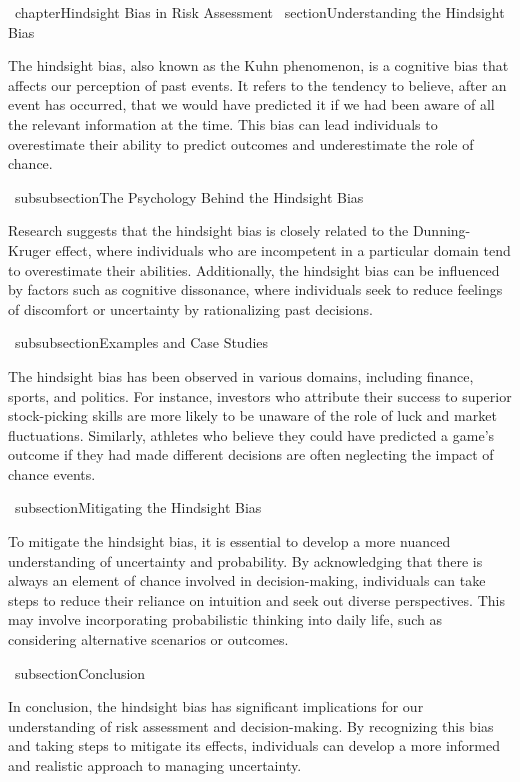 \ chapter{Hindsight Bias in Risk Assessment}
\ section{Understanding the Hindsight Bias}

The hindsight bias, also known as the Kuhn phenomenon, is a cognitive bias that affects our perception of past events. It refers to the tendency to believe, after an event has occurred, that we would have predicted it if we had been aware of all the relevant information at the time. This bias can lead individuals to overestimate their ability to predict outcomes and underestimate the role of chance.

\ subsubsection{The Psychology Behind the Hindsight Bias}

Research suggests that the hindsight bias is closely related to the Dunning-Kruger effect, where individuals who are incompetent in a particular domain tend to overestimate their abilities. Additionally, the hindsight bias can be influenced by factors such as cognitive dissonance, where individuals seek to reduce feelings of discomfort or uncertainty by rationalizing past decisions.

\ subsubsection{Examples and Case Studies}

The hindsight bias has been observed in various domains, including finance, sports, and politics. For instance, investors who attribute their success to superior stock-picking skills are more likely to be unaware of the role of luck and market fluctuations. Similarly, athletes who believe they could have predicted a game's outcome if they had made different decisions are often neglecting the impact of chance events.

\ subsection{Mitigating the Hindsight Bias}

To mitigate the hindsight bias, it is essential to develop a more nuanced understanding of uncertainty and probability. By acknowledging that there is always an element of chance involved in decision-making, individuals can take steps to reduce their reliance on intuition and seek out diverse perspectives. This may involve incorporating probabilistic thinking into daily life, such as considering alternative scenarios or outcomes.

\ subsection{Conclusion}

In conclusion, the hindsight bias has significant implications for our understanding of risk assessment and decision-making. By recognizing this bias and taking steps to mitigate its effects, individuals can develop a more informed and realistic approach to managing uncertainty.